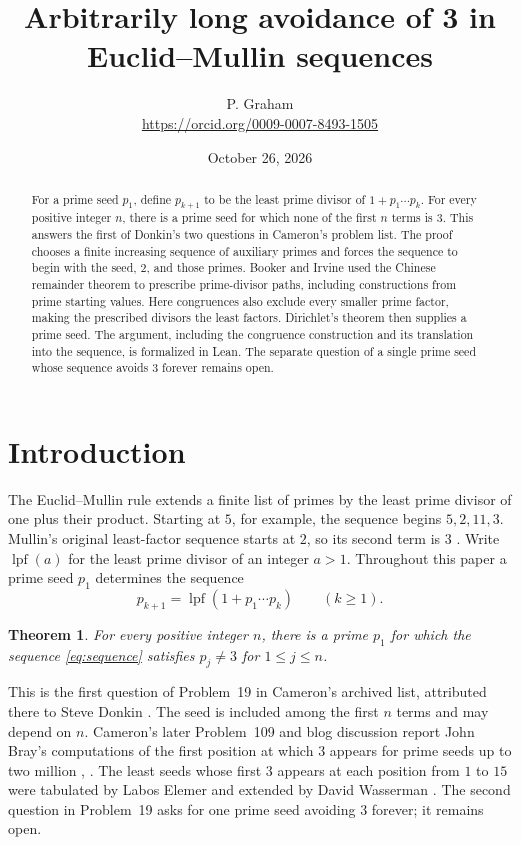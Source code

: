 \documentclass[11pt]{article}
\title{Arbitrarily long avoidance of 3 in Euclid--Mullin sequences}
\author{P. Graham\\ \small\url{https://orcid.org/0009-0007-8493-1505}}
\date{October 26, 2026}
\newtheorem{theorem}{Theorem}
\newcommand{\lpf}{\operatorname{lpf}}
\begin{document}
\maketitle
\begin{abstract}
For a prime seed $p_1$, define $p_{k+1}$ to be the least prime divisor of
$1+p_1\cdots p_k$. For every positive integer $n$, there is a prime seed
for which none of the first $n$ terms is $3$. This answers the first of
Donkin's two questions in Cameron's problem list. The proof chooses a
finite increasing sequence of auxiliary primes and forces the sequence
to begin with the seed, $2$, and those primes. Booker and Irvine used the
Chinese remainder theorem to prescribe prime-divisor paths, including
constructions from prime starting values. Here congruences also exclude every smaller
prime factor, making the prescribed divisors the least factors.
Dirichlet's theorem then supplies a prime seed. The argument, including
the congruence construction and its translation into the sequence, is
formalized in Lean. The separate question of a single prime seed whose
sequence avoids $3$ forever remains open.
\end{abstract}

\section{Introduction}

The Euclid--Mullin rule extends a finite list of primes by the least
prime divisor of one plus their product. Starting at $5$, for example,
the sequence begins $5,2,11,3$. Mullin's original least-factor sequence
starts at $2$, so its second term is $3$ \cite{mullin}. Write $\lpf(a)$ for the least prime
divisor of an integer $a>1$. Throughout this paper a prime seed $p_1$
determines the sequence
\begin{equation}\label{eq:sequence}
 p_{k+1}=\lpf(1+p_1\cdots p_k)\qquad(k\geq1).
\end{equation}

\begin{theorem}\label{thm:main}
For every positive integer $n$, there is a prime $p_1$ for which the
sequence \eqref{eq:sequence} satisfies $p_j\ne3$ for $1\leq j\leq n$.
\end{theorem}

This is the first question of Problem~19 in Cameron's archived list,
attributed there to Steve Donkin \cite[Problem~19]{cameron}.
The seed is included among the first $n$ terms and may depend on $n$.
Cameron's later Problem~109 and blog discussion report John Bray's computations of the first
position at which $3$ appears for prime seeds up to two million
\cite[Problem~109]{cameron}, \cite{cameron-blog}.
The least seeds whose first $3$ appears at each position from $1$ to $15$
were tabulated by Labos Elemer and extended by David Wasserman
\cite{oeis}. The second question in Problem~19 asks for one prime
seed avoiding $3$ forever; it remains open.
\end{document}
